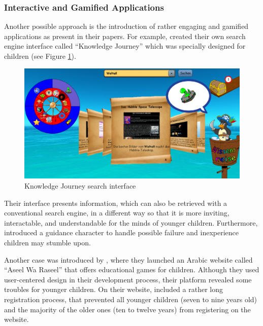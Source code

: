 \subsubsection{Interactive and Gamified Applications}
Another possible approach is the introduction of rather engaging and gamified applications as \textcite{gossen2012search, alhussayen2015evaluating, lozano2016dedigitalizing, gan2015enhancing, engen2017collaborative} present in their papers. For example, \textcite{gossen2012search} created their own search engine interface called ``Knowledge Journey'' which was specially designed for children (see Figure \ref{figure:KnowledgeJourney}). 
\begin{figure}[!ht]
    \centering
    \includegraphics[width=1 \linewidth]{images/knowledge_journey.png}
    \caption{
        Knowledge Journey search interface \autocite[60]{gossen2012search}
    }
    \label{figure:KnowledgeJourney}
\end{figure}
Their interface presents information, which can also be retrieved with a conventional search engine, in a different way so that it is more inviting, interactable, and understandable for the minds of younger children. Furthermore, \textcite{gossen2012search} introduced a guidance character to handle possible failure and inexperience children may stumble upon.

Another case was introduced by \textcite{alhussayen2015evaluating}, where they launched an Arabic website called ``Aseel Wa Raseel'' that offers educational games for children. Although they used user-centered design in their development process, their platform revealed some troubles for younger children. On their website, \textcite{alhussayen2015evaluating} included a rather long registration process, that prevented all younger children (seven to nine years old) and the majority of the older ones (ten to twelve years) from registering on the website. 

